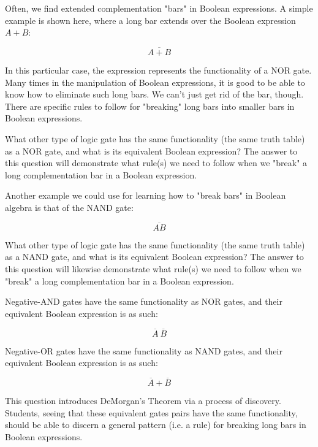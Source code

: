 

Often, we find extended complementation "bars" in Boolean expressions.  A simple example is shown here, where a long bar extends over the Boolean expression $A + B$:

$$\overline{A + B}$$

In this particular case, the expression represents the functionality of a NOR gate.  Many times in the manipulation of Boolean expressions, it is good to be able to know how to eliminate such long bars.  We can't just get rid of the bar, though.  There are specific rules to follow for "breaking" long bars into smaller bars in Boolean expressions.

What other type of logic gate has the same functionality (the same truth table) as a NOR gate, and what is its equivalent Boolean expression?  The answer to this question will demonstrate what rule(s) we need to follow when we "break" a long complementation bar in a Boolean expression.

\vskip 10pt

Another example we could use for learning how to "break bars" in Boolean algebra is that of the NAND gate:

$$\overline{AB}$$

What other type of logic gate has the same functionality (the same truth table) as a NAND gate, and what is its equivalent Boolean expression?  The answer to this question will likewise demonstrate what rule(s) we need to follow when we "break" a long complementation bar in a Boolean expression.







Negative-AND gates have the same functionality as NOR gates, and their equivalent Boolean expression is as such:

$$\overline{A} \> \overline{B}$$

\vskip 10pt

Negative-OR gates have the same functionality as NAND gates, and their equivalent Boolean expression is as such:

$$\overline{A} + \overline{B}$$







This question introduces DeMorgan's Theorem via a process of discovery.  Students, seeing that these equivalent gates pairs have the same functionality, should be able to discern a general pattern (i.e. a rule) for breaking long bars in Boolean expressions.




